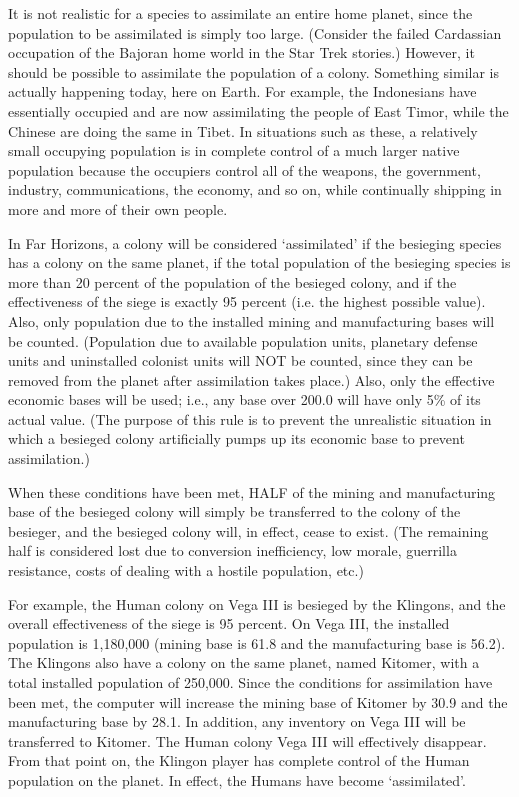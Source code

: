 \documentclass[10pt,titlepage]{article}
\begin{document}
It is not realistic for a species to assimilate an entire home planet, since
the population to be assimilated is simply too large.  (Consider the failed
Cardassian occupation of the Bajoran home world in the Star Trek stories.)
However, it should be possible to assimilate the population of a colony.
Something similar is actually happening today, here on Earth.  For example, the
Indonesians have essentially occupied and are now assimilating the people of
East Timor, while the Chinese are doing the same in Tibet.  In situations such
as these, a relatively small occupying population is in complete control of a
much larger native population because the occupiers control all of the weapons,
the government, industry, communications, the economy, and so on, while
continually shipping in more and more of their own people.

In Far Horizons, a colony will be considered `assimilated' if the besieging
species has a colony on the same planet, if the total population of the
besieging species is more than 20 percent of the population of the besieged
colony, and if the effectiveness of the siege is exactly 95 percent (i.e. the
highest possible value).  Also, only population due to the installed mining and
manufacturing bases will be counted.  (Population due to available population
units, planetary defense units and uninstalled colonist units will NOT be
counted, since they can be removed from the planet after assimilation takes
place.)  Also, only the effective economic bases will be used; i.e., any base
over 200.0 will have only 5\% of its actual value.  (The purpose of this rule
is to prevent the unrealistic situation in which a besieged colony artificially
pumps up its economic base to prevent assimilation.)

When these conditions have been met, HALF of the mining and manufacturing
base of the besieged colony will simply be transferred to the colony of the
besieger, and the besieged colony will, in effect, cease to exist.  (The
remaining half is considered lost due to conversion inefficiency, low morale,
guerrilla resistance, costs of dealing with a hostile population, etc.)

For example, the Human colony on Vega III is besieged by the Klingons, and the
overall effectiveness of the siege is 95 percent.  On Vega III, the installed
population is 1,180,000 (mining base is 61.8 and the manufacturing base is
56.2).  The Klingons also have a colony on the same planet, named Kitomer, with
a total installed population of 250,000.  Since the conditions for assimilation
have been met, the computer will increase the mining base of Kitomer by 30.9
and the manufacturing base by 28.1.  In addition, any inventory on Vega III
will be transferred to Kitomer.  The Human colony Vega III will effectively
disappear.  From that point on, the Klingon player has complete control of
the Human population on the planet.  In effect, the Humans have become
`assimilated'.
\end{document}
